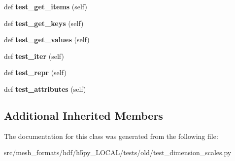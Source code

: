 \begin{DoxyCompactItemize}
def {\bfseries test\+\_\+get\+\_\+items} (self)
\item 
\mbox{\label{classh5py__LOCAL_1_1tests_1_1old_1_1test__dimension__scales_1_1TestDimensionsHighLevel_a26afe9cf6cd97bd5e8e63df62188db73}} 
def {\bfseries test\+\_\+get\+\_\+keys} (self)
\item 
\mbox{\label{classh5py__LOCAL_1_1tests_1_1old_1_1test__dimension__scales_1_1TestDimensionsHighLevel_a4759f10cca8375b42f2d295697366233}} 
def {\bfseries test\+\_\+get\+\_\+values} (self)
\item 
\mbox{\label{classh5py__LOCAL_1_1tests_1_1old_1_1test__dimension__scales_1_1TestDimensionsHighLevel_a95a1099fedfaefe97541fefbecb41587}} 
def {\bfseries test\+\_\+iter} (self)
\item 
\mbox{\label{classh5py__LOCAL_1_1tests_1_1old_1_1test__dimension__scales_1_1TestDimensionsHighLevel_ab76e0f2a0d78573394b3be4dd22cfd7a}} 
def {\bfseries test\+\_\+repr} (self)
\item 
\mbox{\label{classh5py__LOCAL_1_1tests_1_1old_1_1test__dimension__scales_1_1TestDimensionsHighLevel_a482cc1fa3cc77ccf05bcf165654b0630}} 
def {\bfseries test\+\_\+attributes} (self)
\end{DoxyCompactItemize}
\subsection*{Additional Inherited Members}


The documentation for this class was generated from the following file\+:\begin{DoxyCompactItemize}
\item 
src/mesh\+\_\+formats/hdf/h5py\+\_\+\+L\+O\+C\+A\+L/tests/old/test\+\_\+dimension\+\_\+scales.\+py\end{DoxyCompactItemize}
